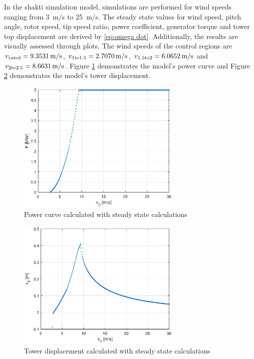 In the \gls{shakti} simulation model, simulations are performed for wind speeds ranging from \SI{3}{m/s} to \SI{25}{m/s}.
The steady state values for wind speed, pitch angle, rotor speed, tip speed ratio, power coefficient, generator torque and tower top displacement are derived by \ref{eq:omega dot}.
Additionally, the results are visually assessed through plots.
The wind speeds of the control regions are $v_{\textnormal{rated}} = \SI{9.3531}{m/s}$, $v_{\textnormal{1to1.5}} = \SI{2.7070}{m/s}$, $v_{\textnormal{1.5to2}} = \SI{6.0652}{m/s}$ and $v_{\textnormal{2to2.5}} = \SI{8.6631}{m/s}$. Figure \ref{fig:power cureve} demonstrates the model's power curve and Figure \ref{fig:Tower displacement} demonstrates the model's tower displacement.

\begin{figure}[h]
	\centering
	\includegraphics[width=0.7\textwidth]{Figures/P_Vs_v.eps}
	\caption{Power curve calculated with steady state calculations}
	\label{fig:power cureve} 
\end{figure}

\begin{figure}[h]
	\centering
	\includegraphics[width=0.7\textwidth]{Figures/Tower_top_displacement.eps}
	\caption{Tower displacement calculated with steady state calculations}
	\label{fig:Tower displacement} 
\end{figure}
